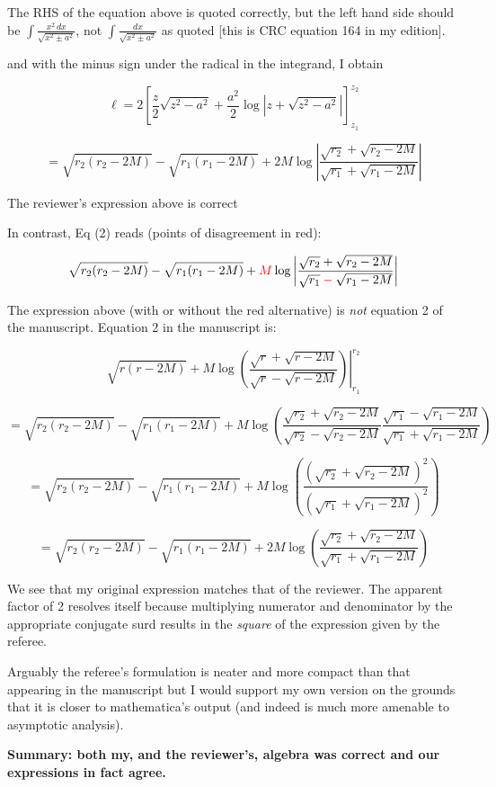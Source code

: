 \documentclass[12pt]{article}
\begin{document}
{\color{blue} The RHS of the equation above is quoted correctly, but
  the left hand side should be $\int\frac{x^2\,dx}{\sqrt{x^2\pm
      a^2}}$, not $\int\frac{dx}{\sqrt{x^2\pm a^2}}$ as quoted [this
    is CRC equation 164 in my edition].  }


 and with the minus sign under the radical in the integrand, I obtain

\[
\ell = 2\left[
  \frac{z}{2}\sqrt{z^2-a^2} + \frac{a^2}{2}\log\left|z+\sqrt{z^2-a^2}\right|
  \right]_{z_1}^{z_2}
\]

\[
=
\sqrt{r_2(r_2-2M)}-\sqrt{r_1(r_1-2M)} + 2M\log\left|
\frac{\sqrt{r_2}+\sqrt{r_2-2M}}{\sqrt{r_1}+\sqrt{r_1-2M}}\right|
\]


{\color{blue} The reviewer's expression above is correct}

In contrast, Eq (2) reads (points of disagreement in red):


\[
\sqrt{r_2(r_2-2M)}-\sqrt{r_1(r_1-2M)} 
+\color{red}M
\color{black}\log\left|
\frac{\sqrt{r_2}+\sqrt{r_2-2M}}{\sqrt{r_1}
  \color{red}-
  \color{black}\sqrt{r_1-2M}}\right|
\]

{\color{blue} The expression above (with or without the red
  alternative) is {\em not} equation 2 of the manuscript. Equation 2
  in the manuscript is:

  \[
  \left.
  \sqrt{r(r-2M)} +M\log\left(
  \frac{\sqrt{r}+\sqrt{r-2M}}{\sqrt{r}-\sqrt{r-2M}}\right)
  \right|_{r_1}^{r_2}
  \]

  \[
  = 
  \sqrt{r_2(r_2-2M)}-  \sqrt{r_1(r_1-2M)}
  +M\log\left(
  \frac{\sqrt{r_2}+\sqrt{r_2-2M}}{\sqrt{r_2}-\sqrt{r_2-2M}}
  \frac{\sqrt{r_1}-\sqrt{r_1-2M}}{\sqrt{r_1}+\sqrt{r_1-2M}}
  \right)
  \]
  
  \[
  = 
  \sqrt{r_2(r_2-2M)}-  \sqrt{r_1(r_1-2M)}
  +M\log\left(
  \frac{
    \left(\sqrt{r_2}+\sqrt{r_2-2M}\right)^2
  }{
    \left(\sqrt{r_1}+\sqrt{r_1-2M}\right)^2
  }
  \right)
  \]

  \[
  = 
  \sqrt{r_2(r_2-2M)}-  \sqrt{r_1(r_1-2M)}
  +2M\log\left(
  \frac{\sqrt{r_2}+\sqrt{r_2-2M}}{\sqrt{r_1}+\sqrt{r_1-2M}}
  \right)
  \]
  
  
We see that my original expression matches that of the reviewer.  The
apparent factor of 2 resolves itself because multiplying numerator and
denominator by the appropriate conjugate surd results in the {\em
  square} of the expression given by the referee.

Arguably the referee's formulation is neater and more compact than
that appearing in the manuscript but I would support my own version on
the grounds that it is closer to mathematica's output (and indeed is
much more amenable to asymptotic analysis).

{\bf Summary: both my, and the reviewer's, algebra was correct and our
  expressions in fact agree.}  }
\end{document}
